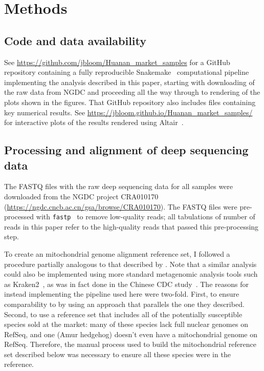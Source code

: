 \documentclass[9pt,twocolumn,twoside]{gsajnl_modified}
\begin{document}
{\small

\section{Methods}
\subsection{Code and data availability}
See \url{https://github.com/jbloom/Huanan_market_samples} for a GitHub repository containing a fully reproducible Snakemake~\citep{molder2021sustainable} computational pipeline implementing the analysis described in this paper, starting with downloading of the raw data from NGDC and proceeding all the way through to rendering of the plots shown in the figures.
That GitHub repository also includes files containing key numerical results.
See \url{https://jbloom.github.io/Huanan_market_samples/} for interactive plots of the results rendered using Altair~\citep{vanderplas2018altair}.

\subsection{Processing and alignment of deep sequencing data}
The FASTQ files with the raw deep sequencing data for all samples were downloaded from the NGDC project CRA010170 (\url{https://ngdc.cncb.ac.cn/gsa/browse/CRA010170}).
The FASTQ files were pre-processed with \texttt{fastp}~\citep{chen2018fastp} to remove low-quality reads; all tabulations of number of reads in this paper refer to the high-quality reads that passed this pre-processing step.

To create an mitochondrial genome alignment reference set, I followed a procedure partially analogous to that described by \citet{crits2023genetic}.
Note that a similar analysis could also be implemented using more standard metagenomic analysis tools such as Kraken2~\citep{wood2019improved}, as was in fact done in the Chinese CDC study~\citep{liu2023surveillance}.
The reasons for instead implementing the pipeline used here were two-fold.
First, to ensure comparability to \citet{crits2023genetic} by using an approach that parallels the one they described.
Second, to use a reference set that includes all of the potentially susceptible species sold at the market: many of these species lack full nuclear genomes on RefSeq, and one (Amur hedgehog) doesn't even have a mitochondrial genome on RefSeq.
Therefore, the manual process used to build the mitochondrial reference set described below was necessary to ensure all these species were in the reference.

}
\end{document}
